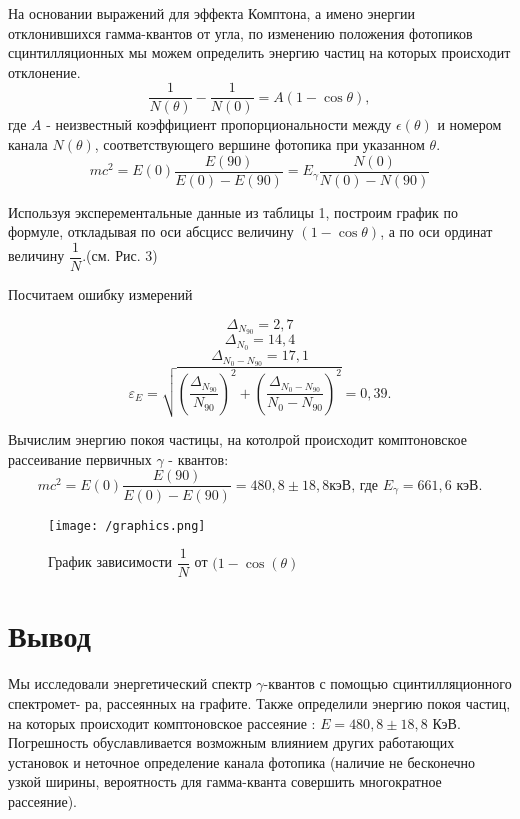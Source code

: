 \documentclass[a4paper,12pt]{article}
\theoremstyle{plain} %
\theoremstyle{definition} %
\theoremstyle{remark} %
\begin{document}
\begin{enumerate}
\begin{minipage}{0.4\textwidth}
  \item На основании выражений для эффекта Комптона, а имено энергии отклонившихся гамма-квантов от угла, по изменению положения фотопиков сцинтилляционных мы можем определить энергию частиц на которых происходит отклонение.
\[ \dfrac{1}{N(\theta)} - \dfrac{1}{N(0)} = A(1 - \cos{\theta}) ,\] где $A$ - неизвестный коэффициент пропорциональности между $\epsilon (\theta)$ и номером канала $N (\theta)$, соответствующего вершине фотопика при указанном $\theta$. 
\[mc^2 = E(0) \dfrac{E(90)}{E(0) - E(90)} = E_\gamma \dfrac{N(0)}{N(0) - N(90)} \]
\end{minipage}
\hfill
\begin{minipage}{0.45\textwidth}
  \item Используя эксперементальные данные из таблицы 1, построим график по формуле, откладывая по оси абсцисс величину $(1 - \cos{\theta})$, а по оси ординат величину $\dfrac{1}{N}$.(см. Рис. 3)
\end{minipage}

\newpage
\item Посчитаем ошибку измерений

\begin{Large}
\[\Delta_{N_{90}} = 2,7\]
\[\Delta_{N_{0}} = 14,4\]
\[\Delta_{N_0 - N_{90}} = 17,1\]
\[\varepsilon_E = \sqrt{\left(\frac{\Delta_{N_{90}}}{N_{90}}\right)^2 + \left(\frac{\Delta_{N_0 - N_{90}}}{N_0 - N_{90}}\right)^2} = 0,39.\]
\end{Large}

\item
Вычислим энергию покоя частицы, на котолрой происходит комптоновское рассеивание первичных $\gamma$ - квантов:
\[mc^2 = E(0) \dfrac{E(90)}{E(0) - E(90)} = 480,8 \pm 18,8 \text{кэВ, где }  E_{\gamma} = 661,6 \text{ кэВ} .\]

\end{enumerate}

\begin{figure}[H]
        \texttt{[image: /graphics.png]}
    \caption{График зависимости $\dfrac{1}{N}$ от $(1 - \cos(\theta)$}
\end{figure}

\section{Вывод}
\indent Мы исследовали энергетический спектр $\gamma$-квантов с помощью сцинтилляционного спектромет- ра, рассеянных на графите. Также определили энергию покоя частиц, на которых происходит комптоновское рассеяние : $E = 480, 8 \pm 18, 8 $ КэВ. Погрешность обуславливается возможным влиянием других работающих установок и неточное определение канала фотопика (наличие не бесконечно узкой ширины, вероятность для гамма-кванта совершить многократное рассеяние).
\end{document}
